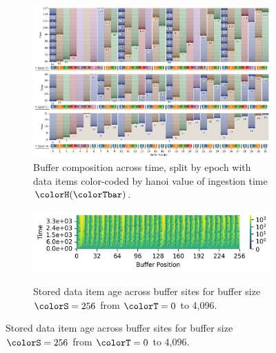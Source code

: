 \begin{figure}[htbp!]
\begin{subfigure}[b]{\linewidth}
\includegraphics[width=\linewidth]{
binder/teeplots/20/num-generations=128+surface-size=32+viz=site-reservation-by-rank-spliced-at-heatmap+ext=.png}
\vspace{-4.5ex}\caption{
  Buffer composition across time, split by epoch with data items color-coded by hanoi value of ingestion time $\colorH(\colorTbar)$.
}
\label{fig:hsurf-tilted-implementation-schematic}
\end{subfigure}

\vspace{0.5ex}
\begin{minipage}[]{\textwidth}
 \vspace{-2pt}
  \begin{subfigure}[t]{0.65\linewidth}
    \vspace{0pt}
    \centering
  \includegraphics[width=0.88\linewidth,clip]{binder/teeplots/20/cnorm=log+num-generations=4096+surface-size=256+viz=site-ingest-depth-by-rank-heatmap+ynorm=linear+ext=.png}  %
  \end{subfigure}%
  \begin{subfigure}[t]{0.35\linewidth}
  \vspace{-2pt}
  \caption{%
    \footnotesize
    Stored data item age across buffer sites for buffer size $\colorS=256$ from $\colorT=0$ to 4,096.
  }
  \label{fig:hsurf-tilted-implementation-heatmap}
\end{subfigure}
\end{minipage}


\end{figure}
